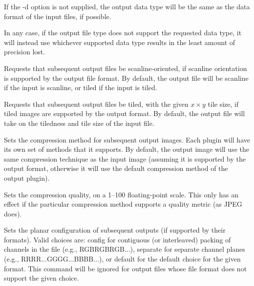 If the {\cf -d} option is not supplied, the output data type will
be the same as the data format of the input files, if possible.

In any case, if the output file type does not support the requested
data type, it will instead use whichever supported data type results
in the least amount of precision lost.
\apiend



Requests that subsequent output files be scanline-oriented, if scanline
orientation is supported by the output file format.  By default, the
output file will be scanline if the input is scanline, or tiled if the
input is tiled.
\apiend

Requests that subsequent output files be tiled, with the given $x \times y$ 
tile size, if tiled images are supported by the output format.
By default, the output file will take on the tiledness and tile size
of the input file.
\apiend

Sets the compression method for subsequent output images.  Each
\ImageOutput plugin will have its own set of methods that it supports.
By default, the output image will use the same compression technique as
the input image (assuming it is supported by the output format,
otherwise it will use the default compression method of the output
plugin).  
\apiend

Sets the compression quality, on a 1--100 floating-point scale.
This only has an effect if the particular compression method supports
a quality metric (as JPEG does).
\apiend

Sets the planar configuration of subsequent outputs (if supported by
their formats).  Valid choices are: {\cf config} for contiguous (or
interleaved) packing of channels in the file (e.g., RGBRGBRGB...), 
{\cf separate} for separate channel planes (e.g.,
RRRR...GGGG...BBBB...), or {\cf default} for the default choice for the
given format.  This command will be ignored for output files whose 
file format does not support the given choice.
\apiend

